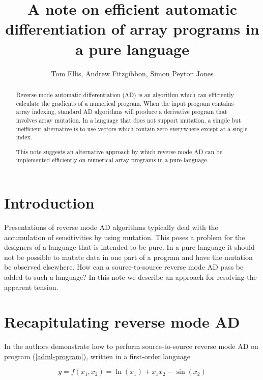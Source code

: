 \documentclass[12pt]{article}
\title{A note on efficient automatic differentiation of array programs
  in a pure language}
\author{Tom Ellis, Andrew Fitzgibbon, Simon Peyton Jones}
\begin{document}
\maketitle

\begin{abstract}
Reverse mode automatic differentiation (AD) is an algorithm which can
efficiently calculate the gradients of a numerical program.  When the
input program contains array indexing, standard AD algorithms will
produce a derivative program that involves array mutation.  In a
language that does not support mutation, a simple but inefficient
alternative is to use vectors which contain zero everywhere except at
a single index.

This note suggests an alternative approach by which reverse mode AD
can be implemented efficiently on numerical array programs in a pure
language.
\end{abstract}

\section{Introduction}

Presentations of reverse mode AD algorithms typically deal with the
accumulation of sensitivities by using mutation.  This poses a problem
for the designers of a language that is intended to be pure.  In a
pure language it should not be possible to mutate data in one part of
a program and have the mutation be observed elsewhere.  How can a
source-to-source reverse mode AD pass be added to such a language?  In
this note we describe an approach for resolving the apparent tension.

\section{Recapitulating reverse mode AD}

In \cite{adml} the authors demonstrate how to perform source-to-source
reverse mode AD on program (\ref{adml-program}), written in a
first-order language

\begin{equation}
\label {adml-program}
y = f(x_1, x_2) = \ln(x_1)+x_1 x_2-\sin(x_2)
\end{equation}
\end{document}
